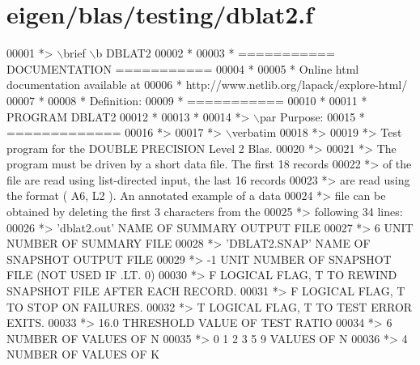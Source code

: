 \hypertarget{eigen_2blas_2testing_2dblat2_8f_source}{}\section{eigen/blas/testing/dblat2.f}
\label{eigen_2blas_2testing_2dblat2_8f_source}

\begin{DoxyCode}
00001 \textcolor{comment}{*> \(\backslash\)brief \(\backslash\)b DBLAT2}
00002 \textcolor{comment}{*}
00003 \textcolor{comment}{*  =========== DOCUMENTATION ===========}
00004 \textcolor{comment}{*}
00005 \textcolor{comment}{* Online html documentation available at }
00006 \textcolor{comment}{*            http://www.netlib.org/lapack/explore-html/ }
00007 \textcolor{comment}{*}
00008 \textcolor{comment}{*  Definition:}
00009 \textcolor{comment}{*  ===========}
00010 \textcolor{comment}{*}
00011 \textcolor{comment}{*       PROGRAM DBLAT2}
00012 \textcolor{comment}{* }
00013 \textcolor{comment}{*}
00014 \textcolor{comment}{*> \(\backslash\)par Purpose:}
00015 \textcolor{comment}{*  =============}
00016 \textcolor{comment}{*>}
00017 \textcolor{comment}{*> \(\backslash\)verbatim}
00018 \textcolor{comment}{*>}
00019 \textcolor{comment}{*> Test program for the DOUBLE PRECISION Level 2 Blas.}
00020 \textcolor{comment}{*>}
00021 \textcolor{comment}{*> The program must be driven by a short data file. The first 18 records}
00022 \textcolor{comment}{*> of the file are read using list-directed input, the last 16 records}
00023 \textcolor{comment}{*> are read using the format ( A6, L2 ). An annotated example of a data}
00024 \textcolor{comment}{*> file can be obtained by deleting the first 3 characters from the}
00025 \textcolor{comment}{*> following 34 lines:}
00026 \textcolor{comment}{*> 'dblat2.out'      NAME OF SUMMARY OUTPUT FILE}
00027 \textcolor{comment}{*> 6                 UNIT NUMBER OF SUMMARY FILE}
00028 \textcolor{comment}{*> 'DBLAT2.SNAP'     NAME OF SNAPSHOT OUTPUT FILE}
00029 \textcolor{comment}{*> -1                UNIT NUMBER OF SNAPSHOT FILE (NOT USED IF .LT. 0)}
00030 \textcolor{comment}{*> F        LOGICAL FLAG, T TO REWIND SNAPSHOT FILE AFTER EACH RECORD.}
00031 \textcolor{comment}{*> F        LOGICAL FLAG, T TO STOP ON FAILURES.}
00032 \textcolor{comment}{*> T        LOGICAL FLAG, T TO TEST ERROR EXITS.}
00033 \textcolor{comment}{*> 16.0     THRESHOLD VALUE OF TEST RATIO}
00034 \textcolor{comment}{*> 6                 NUMBER OF VALUES OF N}
00035 \textcolor{comment}{*> 0 1 2 3 5 9       VALUES OF N}
00036 \textcolor{comment}{*> 4                 NUMBER OF VALUES OF K}

\end{DoxyCode}
